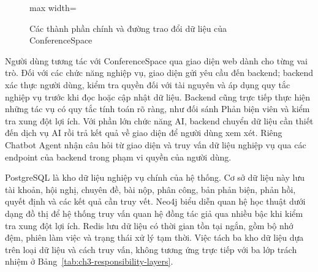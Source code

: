 \begin{figure}[H]
\begin{adjustbox}{max width=\textwidth}
  \end{adjustbox}
  \caption{Các thành phần chính và đường trao đổi dữ liệu của ConferenceSpace}
  \label{fig:ch3-main-components}
\end{figure}

Người dùng tương tác với ConferenceSpace qua giao diện web dành cho từng vai trò. Đối với các chức năng nghiệp vụ, giao diện gửi yêu cầu đến backend; backend xác thực người dùng, kiểm tra quyền đối với tài nguyên và áp dụng quy tắc nghiệp vụ trước khi đọc hoặc cập nhật dữ liệu. Backend cũng trực tiếp thực hiện những tác vụ có quy tắc tính toán rõ ràng, như đối sánh Phản biện viên và kiểm tra xung đột lợi ích. Với phần lớn chức năng AI, backend chuyển dữ liệu cần thiết đến dịch vụ AI rồi trả kết quả về giao diện để người dùng xem xét. Riêng Chatbot Agent nhận câu hỏi từ giao diện và truy vấn dữ liệu nghiệp vụ qua các endpoint của backend trong phạm vi quyền của người dùng.

PostgreSQL là kho dữ liệu nghiệp vụ chính của hệ thống. Cơ sở dữ liệu này lưu tài khoản, hội nghị, chuyên đề, bài nộp, phân công, bản phản biện, phản hồi, quyết định và các kết quả cần truy vết. Neo4j biểu diễn quan hệ học thuật dưới dạng đồ thị để hệ thống truy vấn quan hệ đồng tác giả qua nhiều bậc khi kiểm tra xung đột lợi ích. Redis lưu dữ liệu có thời gian tồn tại ngắn, gồm bộ nhớ đệm, phiên làm việc và trạng thái xử lý tạm thời. Việc tách ba kho dữ liệu dựa trên loại dữ liệu và cách truy vấn, không tương ứng trực tiếp với ba lớp trách nhiệm ở Bảng~\ref{tab:ch3-responsibility-layers}.

